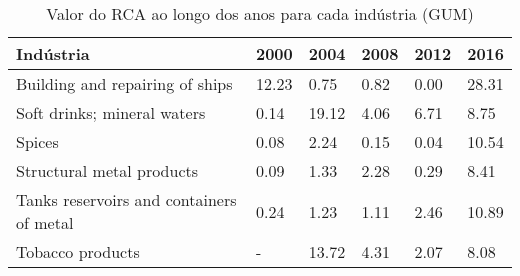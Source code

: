 \begin{table}
\centering
\caption{Valor do RCA ao longo dos anos para cada indústria (GUM)}
\label{tab:ex3-tempo-GUM}
\begin{tabular}{p{6cm}p{1.5cm}p{1.5cm}p{1.5cm}p{1.5cm}p{1.5cm}}
\toprule
                               Indústria &  2000 &  2004 & 2008 & 2012 &  2016 \\
\midrule
         Building and repairing of ships & 12.23 &  0.75 & 0.82 & 0.00 & 28.31 \\
             Soft drinks; mineral waters &  0.14 & 19.12 & 4.06 & 6.71 &  8.75 \\
                                  Spices &  0.08 &  2.24 & 0.15 & 0.04 & 10.54 \\
               Structural metal products &  0.09 &  1.33 & 2.28 & 0.29 &  8.41 \\
Tanks reservoirs and containers of metal &  0.24 &  1.23 & 1.11 & 2.46 & 10.89 \\
                        Tobacco products &     - & 13.72 & 4.31 & 2.07 &  8.08 \\
\bottomrule
\end{tabular}
\end{table}
